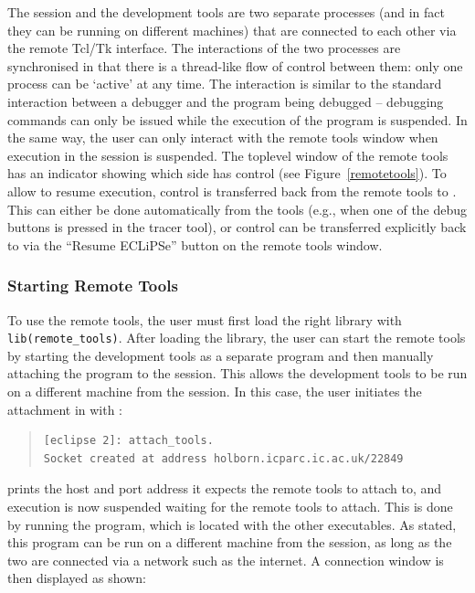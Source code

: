 The {\eclipse} session and the development tools are two separate processes
(and in fact they can be running on different machines) that are connected
to each other via the remote Tcl/Tk interface. The interactions of the two
processes are synchronised in that there is a thread-like flow of control
between them: only one process can be `active' at any time. The interaction
is similar to the standard interaction between a debugger and the program
being debugged -- debugging commands can only be issued
while the execution of the program is suspended. In the same way, the user
can only interact with the remote tools window when execution in the
{\eclipse} session is suspended. The toplevel window of the remote tools
has an indicator showing which side has control (see Figure~\ref{remotetools}).
To allow {\eclipse} to resume execution, control is transferred back from
the remote tools to {\eclipse}. This can either be
done automatically from the tools (e.g., when one of the debug buttons is
pressed in the tracer tool), or control can be transferred explicitly back
to {\eclipse} via the ``Resume ECLiPSe'' button on the remote tools window.


\subsubsection{Starting Remote Tools}

To use the remote tools, the user must first load the right library
with \verb'lib(remote_tools)'. After loading the library, the user can
start the remote tools by
starting the development tools as a separate program and then manually
attaching the program to the {\eclipse} session. This allows the development
tools to be run on a different machine from the {\eclipse} session. In this
case, the user initiates the attachment in {\eclipse} with
:

\begin{quote}
\begin{verbatim}
[eclipse 2]: attach_tools.
Socket created at address holborn.icparc.ic.ac.uk/22849
\end{verbatim}
\end{quote}

{\eclipse} prints the host and port address it expects the remote tools to
attach to, and execution is now suspended waiting for the remote tools to
attach. This is done by running the  program, which is located
with the other {\eclipse} executables. As stated, this program can be run
on a different machine from the {\eclipse} session, as long as the two are
connected via a network such as the internet. A connection window is then
displayed as shown:
\vfill %

